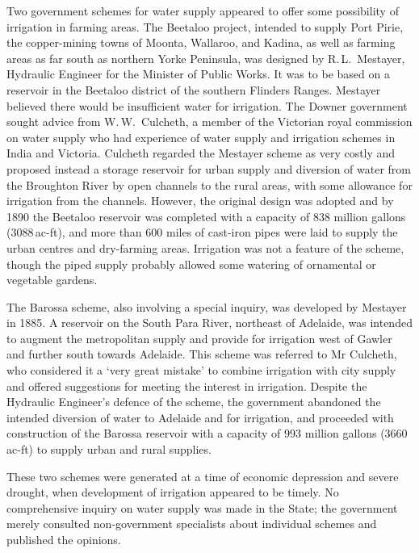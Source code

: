 Two government schemes for water supply appeared to offer some
possibility of irrigation in farming areas.  The Beetaloo project,
intended to supply Port Pirie, the copper-mining towns of Moonta,
Wallaroo, and Kadina, as well as farming areas as far south as
northern Yorke Peninsula, was designed by R.\,L.~Mestayer, Hydraulic
Engineer for the Minister of Public Works.
It was to be based on a reservoir in the Beetaloo district of the
southern Flinders Ranges.  Mestayer believed there would be
insufficient water for irrigation.  The Downer government sought
advice from W.\,W.~Culcheth, a member of the Victorian royal
commission on water supply who had experience of water supply and
irrigation schemes in India and Victoria.  Culcheth regarded the
Mestayer scheme as very costly and proposed instead a storage
reservoir for urban supply and diversion of water from the Broughton
River by open channels to the rural areas, with some allowance for
irrigation from the channels.  However, the
original design was adopted and by 1890 the Beetaloo reservoir was
completed with a capacity of 838 million gallons (3088\,ac-ft), and
more than 600 miles of cast-iron pipes were laid to supply the urban
centres and dry-farming areas.  Irrigation was not a feature of the
scheme, though the piped supply probably allowed some watering of
ornamental or vegetable gardens.

The Barossa scheme, also involving a special inquiry, was developed by
Mestayer in 1885.  A reservoir on the
South Para River, northeast of Adelaide, was intended to augment the
metropolitan supply and provide for irrigation west of Gawler and
further south towards Adelaide.  This scheme was referred to Mr
Culcheth, who considered it a `very great mistake' to combine
irrigation with city supply and offered suggestions for meeting the
interest in irrigation.  Despite the
Hydraulic Engineer's defence of the scheme, the government abandoned
the intended diversion of water to Adelaide and for irrigation, and
proceeded with construction of the Barossa reservoir with a capacity
of 993 million gallons (3660\,ac-ft) to supply urban and rural
supplies.

These two schemes were generated at a time of economic depression and
severe drought, when development of irrigation appeared to be
timely. No comprehensive inquiry on water supply was made in the
State; the government merely consulted non-government specialists
about individual schemes and published the opinions.

